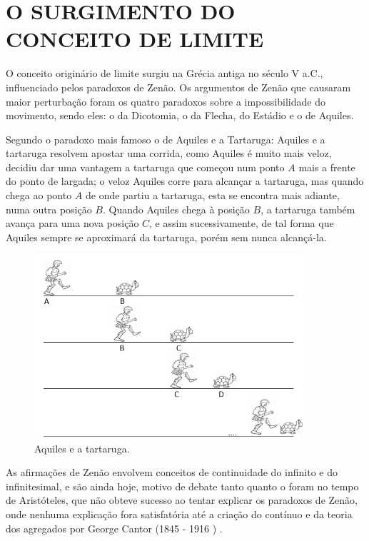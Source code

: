 \chapter{O SURGIMENTO DO CONCEITO DE LIMITE}
O conceito originário de limite surgiu na Grécia antiga no século V a.C., influenciado pelos paradoxos de Zenão. Os argumentos de Zenão que causaram maior perturbação foram os quatro paradoxos sobre a impossibilidade do movimento, sendo eles: o da Dicotomia, o da Flecha, do Estádio e o de Aquiles.



\medskip
Segundo o paradoxo mais famoso o de Aquiles e a Tartaruga: Aquiles e a tartaruga resolvem apostar uma corrida, como Aquiles é muito mais veloz, decidiu dar uma vantagem a tartaruga que começou num ponto $A$ mais a frente do ponto de largada; o veloz Aquiles corre para alcançar a tartaruga, mas quando chega ao ponto $A$ de onde partiu a tartaruga, esta se encontra mais adiante, numa outra posição $B$. Quando Aquiles chega à posição $B$, a tartaruga também avança para uma nova posição $C$, e assim sucessivamente, de tal forma que Aquiles sempre se aproximará da tartaruga, porém sem nunca alcançá-la.

\medskip

\begin{figure}[H]
\centering %
\includegraphics[width=10cm]{img/aquiles.png} %
\caption{Aquiles e a tartaruga.}
\label{fig:aquiles}
\end{figure}


\medskip

As afirmações de Zenão
envolvem conceitos de continuidade do infinito e do infinitesimal, e
são ainda hoje, motivo de debate tanto quanto o foram no tempo de
Aristóteles, que não obteve sucesso ao tentar explicar os paradoxos
de Zenão, onde nenhuma explicação fora satisfatória até a criação do
contínuo e da teoria dos agregados por George Cantor (1845 - 1916
) \cite{cajori}.\\


